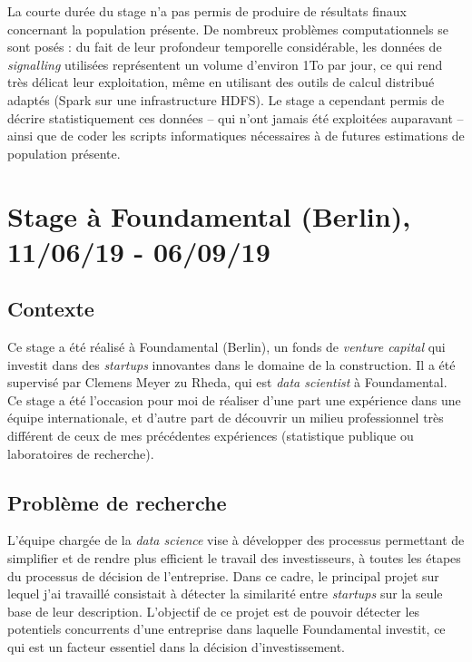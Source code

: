 \documentclass[12pt]{article}
\begin{document}
La courte durée du stage n'a pas permis de produire de résultats finaux concernant la population présente. De nombreux problèmes computationnels se sont posés : du fait de leur profondeur temporelle considérable, les données de \textit{signalling} utilisées représentent un volume d'environ 1To par jour, ce qui rend très délicat leur exploitation, même en utilisant des outils de calcul distribué adaptés (Spark sur une infrastructure HDFS). Le stage a cependant permis de décrire statistiquement ces données -- qui n'ont jamais été exploitées auparavant -- ainsi que de coder les scripts informatiques nécessaires à de futures estimations de population présente.

\section{Stage à Foundamental (Berlin), 11/06/19 - 06/09/19}

\subsection{Contexte}

Ce stage a été réalisé à Foundamental (Berlin), un fonds de \textit{venture capital} qui investit dans des \textit{startups} innovantes dans le domaine de la construction. Il a été supervisé par Clemens Meyer zu Rheda, qui est \textit{data scientist} à Foundamental. Ce stage a été l'occasion pour moi de réaliser d'une part une expérience dans une équipe internationale, et d'autre part de découvrir un milieu professionnel très différent de ceux de mes précédentes expériences (statistique publique ou laboratoires de recherche).

\subsection{Problème de recherche}

L'équipe chargée de la \textit{data science} vise à développer des processus permettant de simplifier et de rendre plus efficient le travail des investisseurs, à toutes les étapes du processus de décision de l'entreprise. Dans ce cadre, le principal projet sur lequel j'ai travaillé consistait à détecter la similarité entre \textit{startups} sur la seule base de leur description. L'objectif de ce projet est de pouvoir détecter les potentiels concurrents d'une entreprise dans laquelle Foundamental investit, ce qui est un facteur essentiel dans la décision d'investissement. 
\end{document}
